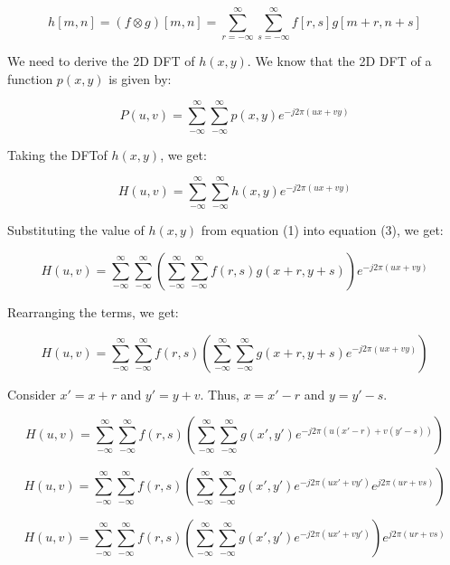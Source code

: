 \documentclass[12pt]{article}
\begin{document}
\begin{equation}
    h[m, n] = (f \otimes g)[m, n] = \sum_{r=-\infty}^{\infty} \sum_{s=-\infty}^{\infty} f[r, s]g[m+r, n+s]
\end{equation}

We need to derive the 2D DFT of $h(x, y)$. We know that the 2D DFT of a function $p(x, y)$ is given by: 

\begin{equation}
    P(u, v) = \sum_{-\infty}^{\infty} \sum_{-\infty}^{\infty} p(x, y) e^{-j2\pi(ux+vy)} 
\end{equation}

Taking the DFTof $h(x, y)$, we get:

\begin{equation}
    H(u, v) = \sum_{-\infty}^{\infty} \sum_{-\infty}^{\infty} h(x, y) e^{-j2\pi(ux+vy)}
\end{equation}

Substituting the value of $h(x, y)$ from equation (1) into equation (3), we get:

\begin{equation}
    H(u, v) = \sum_{-\infty}^{\infty} \sum_{-\infty}^{\infty} \left( \sum_{-\infty}^{\infty} \sum_{-\infty}^{\infty} f(r, s)g(x+r, y+s)\right) e^{-j2\pi(ux+vy)}
\end{equation}

Rearranging the terms, we get:

\begin{equation}
    H(u, v) = \sum_{-\infty}^{\infty} \sum_{-\infty}^{\infty} f(r, s) \left( \sum_{-\infty}^{\infty} \sum_{-\infty}^{\infty} g(x+r, y+s) e^{-j2\pi(ux+vy)}\right)
\end{equation}


Consider $x' = x + r$ and $y' = y + v$. Thus, $x = x' - r$ and $y = y' - s$.

\begin{equation}
    H(u, v) = \sum_{-\infty}^{\infty} \sum_{-\infty}^{\infty} f(r, s) \left( \sum_{-\infty}^{\infty} \sum_{-\infty}^{\infty} g(x', y') e^{-j2\pi(u(x'-r)+v(y'-s))} \right)
\end{equation}

\begin{equation}
    H(u, v) = \sum_{-\infty}^{\infty} \sum_{-\infty}^{\infty} f(r, s) \left( \sum_{-\infty}^{\infty} \sum_{-\infty}^{\infty} g(x', y') e^{-j2\pi(ux'+vy')} e^{j2\pi(ur+vs)}\right)
\end{equation}

\begin{equation}
    H(u, v) = \sum_{-\infty}^{\infty} \sum_{-\infty}^{\infty} f(r, s) \left( \sum_{-\infty}^{\infty} \sum_{-\infty}^{\infty} g(x', y') e^{-j2\pi(ux'+vy')}\right) e^{j2\pi(ur+vs)}
\end{equation}
\end{document}
